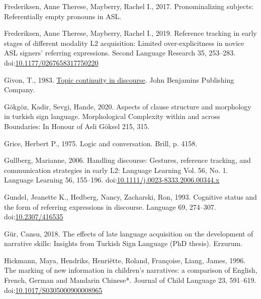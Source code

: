 \documentclass[]{elsarticle} %
\newlength{\cslhangindent}
\newenvironment{CSLReferences}[2] %
 {%
  \setlength{\parindent}{0pt}
  \ifodd #1 \everypar{\setlength{\hangindent}{\cslhangindent}}\ignorespaces\fi
  \ifnum #2 > 0
  \setlength{\parskip}{#2\baselineskip}
  \fi
 }%
 {}
\begin{document}
\begin{CSLReferences}{1}{0}
\leavevmode{}%
Frederiksen, Anne Therese, Mayberry, Rachel I., 2017. Pronominalizing
subjects: Referentially empty pronouns in ASL.

\leavevmode{}%
Frederiksen, Anne Therese, Mayberry, Rachel I., 2019. Reference tracking
in early stages of different modality L2 acquisition: Limited
over-explicitness in novice ASL signers{'} referring expressions. Second
Language Research 35, 253--283.
doi:\href{https://doi.org/10.1177/0267658317750220}{10.1177/0267658317750220}

\leavevmode{}%
Givon, T., 1983. \href{https://benjamins.com/catalog/tsl.3}{Topic
continuity in discourse}. John Benjamins Publishing Company.

\leavevmode{}%
Gökgöz, Kadir, Sevgi, Hande, 2020. Aspects of clause structure and
morphology in turkish sign language. Morphological Complexity within and
across Boundaries: In Honour of Asli Göksel 215, 315.

\leavevmode{}%
Grice, Herbert P., 1975. Logic and conversation. Brill, p. 4158.

\leavevmode{}%
Gullberg, Marianne, 2006. Handling discourse: Gestures, reference
tracking, and communication strategies in early L2: Language Learning
Vol. 56, No. 1. Language Learning 56, 155--196.
doi:\href{https://doi.org/10.1111/j.0023-8333.2006.00344.x}{10.1111/j.0023-8333.2006.00344.x}

\leavevmode{}%
Gundel, Jeanette K., Hedberg, Nancy, Zacharski, Ron, 1993. Cognitive
status and the form of referring expressions in discourse. Language 69,
274--307. doi:\href{https://doi.org/10.2307/416535}{10.2307/416535}

\leavevmode{}%
Gür, Cansu, 2018. The effects of late language acquisition on the
development of narrative skills: Insights from Turkish Sign Language
(PhD thesis). Erzurum.

\leavevmode{}%
Hickmann, Maya, Hendriks, Henriëtte, Roland, Françoise, Liang, James,
1996. The marking of new information in children's narratives: a
comparison of English, French, German and Mandarin Chinese*. Journal of
Child Language 23, 591--619.
doi:\href{https://doi.org/10.1017/S0305000900008965}{10.1017/S0305000900008965}


\end{CSLReferences}
\end{document}

